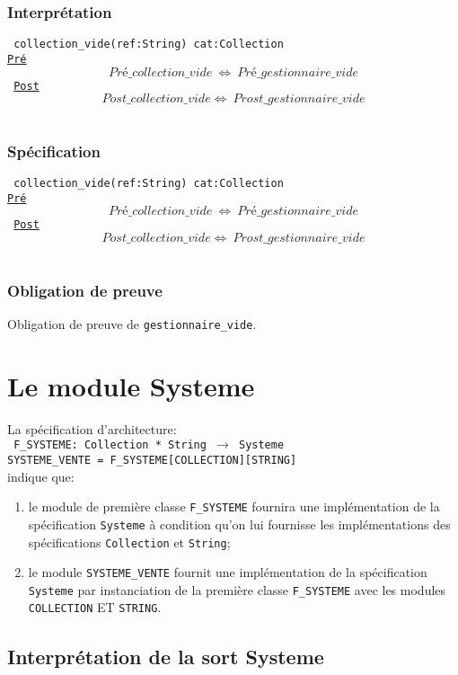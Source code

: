 \documentclass{article}
\begin{document}
\subsubsection{Interprétation}
{\tt
collection\_vide(ref:String) cat:Collection\\
\underline{Pré}
$$ Pré\_collection\_vide\ \Leftrightarrow\ Pré\_gestionnaire\_vide $$
\underline{Post}
$$ Post\_collection\_vide \Leftrightarrow\ Prost\_gestionnaire\_vide $$
}

\subsubsection{Spécification}
{\tt
collection\_vide(ref:String) cat:Collection\\
\underline{Pré}
$$ Pré\_collection\_vide\ \Leftrightarrow\ Pré\_gestionnaire\_vide $$
\underline{Post}
$$ Post\_collection\_vide \Leftrightarrow\ Prost\_gestionnaire\_vide $$
}

\subsubsection{Obligation de preuve}
Obligation de preuve de \texttt{gestionnaire\_vide}.

\section{Le module Systeme}
La spécification d'architecture:\\
{\tt
F\_SYSTEME: Collection * String $\rightarrow$ Systeme\\
SYSTEME\_VENTE = F\_SYSTEME[COLLECTION][STRING]\\
}
indique que:
\begin{enumerate}
\item le module de première classe \texttt{F\_SYSTEME} fournira une implémentation de la spécification \texttt{Systeme} à condition qu'on lui fournisse les implémentations des spécifications \texttt{Collection} et \texttt{String};
\item le module \texttt{SYSTEME\_VENTE} fournit une implémentation de la spécification \texttt{Systeme} par instanciation de la première classe \texttt{F\_SYSTEME} avec les modules \texttt{COLLECTION} ET \texttt{STRING}.
\end{enumerate}

\subsection{Interprétation de la sort Systeme}
\end{document}
